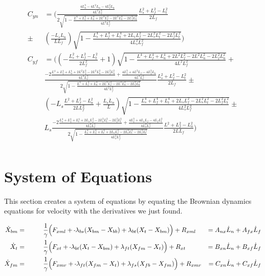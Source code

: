 \documentclass[11pt, landscape]{article}
\newcommand{\mn}{\scalebox{0.7}[1.0]{-}}
\begin{document}
\begin{align}
  C_{yn} &= \Bigg(\frac{\frac{4L_n^3 - 4L^2L_n - 4L_f^2L_n}{4L^2L_f^2}}{2\sqrt{1-\frac{L^4 + L_f^4 + L_n^4 + 2L^2L_f^2 - 2L^2L_n^2 - 2L_f^2L_n^2}{4L^2L_f^2}}}\frac{L_{s}^2+L_f^2-L_{t}^2}{2L_f}\\
    \pm &\left(\frac{-L_sL_n}{LL_f}\right)\sqrt{1-\frac{L_s^4 + L_f^4 + L_t^4 + 2L_sL_f^2 - 2L_s^2L_t^2 - 2L_f^2L_t^2}{4L_s^2L_f^2}}\Bigg)\\
  C_{yf} &= \Bigg(\left(-\frac{L_{s}^2+L_f^2-L_{t}^2}{2L_f^2} + 1\right)\sqrt{1-\frac{L^4 + L_f^4 + L_n^4 + 2L^2L_f^2 - 2L^2L_n^2 - 2L_f^2L_n^2}{4L^2L_f^2}} +\\
    &\frac{-2\frac{L^4 + L_f^4 + L_n^4 + 2L^2L_f^2 - 2L^2L_n^2 - 2L_f^2L_n^2}{4L^2L_f^3} + \frac{4L_f^3 + 4L^2L_f - 4L_f^2L_n}{4L^2L_f^2}}{2\sqrt{1-\frac{L^4 + L_f^4 + L_n^4 + 2L^2L_f^2 - 2L^2L_n^2 - 2L_f^2L_n^2}{4L^2L_f^2}}}\frac{L_{s}^2+L_f^2-L_{t}^2}{2L_f} \pm\\
    &\left(-L_s\frac{L^2+L_f^2-L_n^2}{2LL_f^2} + \frac{L_s\dot{L}_n}{L}\right)\sqrt{1-\frac{L_s^4 + L_f^4 + L_t^4 + 2L_sL_f^2 - 2L_s^2L_t^2 - 2L_f^2L_t^2}{4L_s^2L_f^2}} \pm\\
    &L_s\frac{-2\frac{L_s^4 + L_f^4 + L_t^4 + 2L_sL_f^2 - 2L_s^2L_t^2 - 2L_f^2L_t^2}{4L_s^2L_f^3} + \frac{4L_f^3 + 4L_sL_f - 4L_fL_t^2}{4L_s^2L_f^2}}{2\sqrt{1-\frac{L_s^4 + L_f^4 + L_t^4 + 2L_sL_f^2 - 2L_s^2L_t^2 - 2L_f^2L_t^2}{4L_s^2L_f^2}}}\frac{L^2+L_f^2-L_n^2}{2LL_f}\Bigg)\\
\end{align}

\section{System of Equations}
This section creates a system of equations by equating the Brownian dynamics equations for velocity with the derivatives we just found.

\begin{align}  
  \dot{X}_{bm} = \hspace{1cm}& \frac{1}{\gamma} \Big(F_{xml} + \mn \lambda_{bs}(X_{bm} - X_{bb}) + \lambda_{bt}(X_{t } - X_{bm}) \Big) + R_{xml}  &= A_{nx}\dot{L}_n + A_{fx}\dot{L}_f\\
  \dot{X}_{t } = \hspace{1cm}& \frac{1}{\gamma} \Big(F_{xt } + \mn \lambda_{bt}(X_{t } - X_{bm}) + \lambda_{ft}(X_{fm} - X_{t }) \Big) + R_{xt } &= B_{xn}\dot{L}_n + B_{xf}\dot{L}_f\\
  \dot{X}_{fm} = \hspace{1cm}& \frac{1}{\gamma} \Big(F_{xmr} + \mn \lambda_{ft}(X_{fm} - X_{t }) + \lambda_{fs}(X_{fb} - X_{fm}) \Big) + R_{xmr} &= C_{xn}\dot{L}_n + C_{xf}\dot{L}_f
\end{align}
\end{document}
